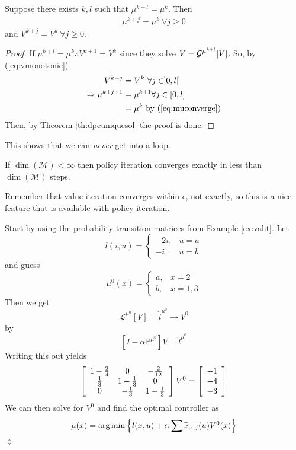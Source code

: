\begin{theorem}
Suppose there exists $k,l$ such that $\mu^{k+l} = \mu^k$. Then
\begin{align}
\label{eq:muconverge}
\mu^{k+j}=\mu^k ~\forall j\geq 0
\end{align}
and $V^{k+j}=V^k ~\forall j\geq0$.
\end{theorem}

\begin{proof}
If $\mu^{k+l}=\mu^k \therefore V^{k+1}=V^k$ since they solve $V=\mathcal{G}^{\mu^{k+l}}[V]$. So, by (\ref{eq:vmonotonic})
\begin{align*}
V^{k+j} &= V^k ~\forall j\in ]0,l[ \\
\Rightarrow \mu^{k+j+1} &= \mu^{k+1} \forall j\in [0,l] \\
&= \mu^k \text{ by (\ref{eq:muconverge})}
\end{align*}
Then, by Theorem \ref{th:dpeuniquesol} the proof is done.
\end{proof}
This shows that we can \textit{never} get into a loop.

\begin{corollary}
If $\dim(\mathcal{M})<\infty$ then policy iteration converges exactly in less than $\dim(\mathcal{M})$ steps.
\end{corollary}

Remember that value iteration converges within $\epsilon$, not exactly, so this is a nice feature that is available with policy iteration.

\begin{example}
Start by using the probability transition matrices from Example \ref{ex:valit}. Let
$$l(i,u) = \begin{cases} -2i, & u=a \\ -i, & u=b \end{cases}$$
and guess
$$\mu^0(x) = \begin{cases} a, & x=2 \\ b, & x=1,3 \end{cases}$$
Then we get
$$\mathcal{L}^{\mu^0}[V]=\hat{l}^{\mu^0} \to V^0$$
by
$$[I-\alpha\mathbb{P}^{\mu^0}]V=\hat{l}^{\mu^0}$$
Writing this out yields
\begin{align}
\left[\begin{array}{c c c}
1-\frac{2}{4} & 0 & -\frac{2}{12} \\
\frac{1}{3} & 1-\frac{1}{3} & 0 \\
0 & -\frac{1}{3} & 1-\frac{1}{3}
\end{array}\right] V^0 =
\left[\begin{array}{c}
-1 \\ -4 \\ -3
\end{array}\right]
\end{align}
We can then solve for $V^0$ and find the optimal controller as
$$\mu(x) = \arg\min\left\lbrace l(x,u)+\alpha\sum\mathbb{P}_{x,j}(u)V^0(x)\right\rbrace$$
$\lozenge$
\end{example}

